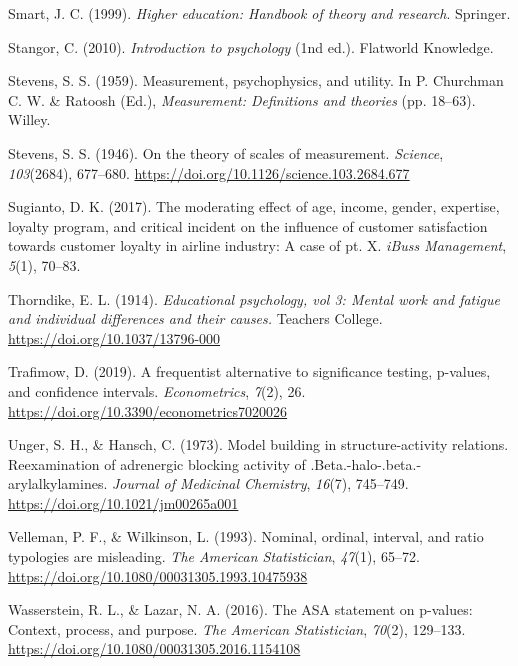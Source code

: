 \documentclass[
]{book}
\begin{document}
\leavevmode\hypertarget{ref-smart1999}{}%
Smart, J. C. (1999). \emph{Higher education: Handbook of theory and
research}. Springer.

\leavevmode\hypertarget{ref-stangor2010}{}%
Stangor, C. (2010). \emph{Introduction to psychology} (1nd ed.).
Flatworld Knowledge.

\leavevmode\hypertarget{ref-stevens1959}{}%
Stevens, S. S. (1959). Measurement, psychophysics, and utility. In P.
Churchman C. W. \& Ratoosh (Ed.), \emph{Measurement: Definitions and
theories} (pp. 18--63). Willey.

\leavevmode\hypertarget{ref-Stevens1946}{}%
Stevens, S. S. (1946). On the theory of scales of measurement.
\emph{Science}, \emph{103}(2684), 677--680.
\url{https://doi.org/10.1126/science.103.2684.677}

\leavevmode\hypertarget{ref-Sugianto2017}{}%
Sugianto, D. K. (2017). The moderating effect of age, income, gender,
expertise, loyalty program, and critical incident on the influence of
customer satisfaction towards customer loyalty in airline industry: A
case of pt. X. \emph{iBuss Management}, \emph{5}(1), 70--83.

\leavevmode\hypertarget{ref-Thorndike1914}{}%
Thorndike, E. L. (1914). \emph{Educational psychology, vol 3: Mental
work and fatigue and individual differences and their causes.} Teachers
College. \url{https://doi.org/10.1037/13796-000}

\leavevmode\hypertarget{ref-Trafimow2019}{}%
Trafimow, D. (2019). A frequentist alternative to significance testing,
p-values, and confidence intervals. \emph{Econometrics}, \emph{7}(2),
26. \url{https://doi.org/10.3390/econometrics7020026}

\leavevmode\hypertarget{ref-Unger1973}{}%
Unger, S. H., \& Hansch, C. (1973). Model building in structure-activity
relations. Reexamination of adrenergic blocking activity of
.Beta.-halo-.beta.-arylalkylamines. \emph{Journal of Medicinal
Chemistry}, \emph{16}(7), 745--749.
\url{https://doi.org/10.1021/jm00265a001}

\leavevmode\hypertarget{ref-Velleman1993}{}%
Velleman, P. F., \& Wilkinson, L. (1993). Nominal, ordinal, interval,
and ratio typologies are misleading. \emph{The American Statistician},
\emph{47}(1), 65--72.
\url{https://doi.org/10.1080/00031305.1993.10475938}

\leavevmode\hypertarget{ref-Wasserstein2016}{}%
Wasserstein, R. L., \& Lazar, N. A. (2016). The ASA statement on
p-values: Context, process, and purpose. \emph{The American
Statistician}, \emph{70}(2), 129--133.
\url{https://doi.org/10.1080/00031305.2016.1154108}
\end{document}
